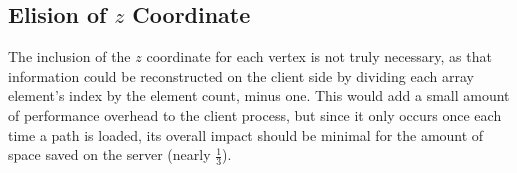 \subsection{Elision of $z$ Coordinate}
\label{elision}
    The inclusion of the $z$ coordinate for each vertex is not truly necessary, as that information could be reconstructed on the client side by dividing each array element's index by the element count, minus one. This would add a small amount of performance overhead to the client process, but since it only occurs once each time a path is loaded, its overall impact should be minimal for the amount of space saved on the server (nearly $\frac{1}{3}$).


